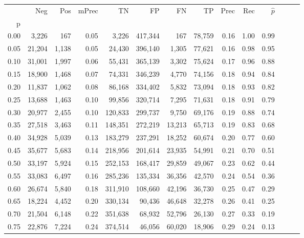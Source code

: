 \begin{tabular}{rrrrrrrrrrrrrr}
\toprule
{} &     Neg &    Pos & mPrec &       TN &       FP &      FN &      TP &  Prec &   Rec & $\hat{p}$ \\
p    &         &        &       &          &          &         &         &       &       &           \\
\midrule
0.00 &   3,226 &    167 &  0.05 &    3,226 &  417,344 &     167 &  78,759 &  0.16 &  1.00 &      0.99 \\
0.05 &  21,204 &  1,138 &  0.05 &   24,430 &  396,140 &   1,305 &  77,621 &  0.16 &  0.98 &      0.95 \\
0.10 &  31,001 &  1,997 &  0.06 &   55,431 &  365,139 &   3,302 &  75,624 &  0.17 &  0.96 &      0.88 \\
0.15 &  18,900 &  1,468 &  0.07 &   74,331 &  346,239 &   4,770 &  74,156 &  0.18 &  0.94 &      0.84 \\
0.20 &  11,837 &  1,062 &  0.08 &   86,168 &  334,402 &   5,832 &  73,094 &  0.18 &  0.93 &      0.82 \\
0.25 &  13,688 &  1,463 &  0.10 &   99,856 &  320,714 &   7,295 &  71,631 &  0.18 &  0.91 &      0.79 \\
0.30 &  20,977 &  2,455 &  0.10 &  120,833 &  299,737 &   9,750 &  69,176 &  0.19 &  0.88 &      0.74 \\
0.35 &  27,518 &  3,463 &  0.11 &  148,351 &  272,219 &  13,213 &  65,713 &  0.19 &  0.83 &      0.68 \\
0.40 &  34,928 &  5,039 &  0.13 &  183,279 &  237,291 &  18,252 &  60,674 &  0.20 &  0.77 &      0.60 \\
0.45 &  35,677 &  5,683 &  0.14 &  218,956 &  201,614 &  23,935 &  54,991 &  0.21 &  0.70 &      0.51 \\
0.50 &  33,197 &  5,924 &  0.15 &  252,153 &  168,417 &  29,859 &  49,067 &  0.23 &  0.62 &      0.44 \\
0.55 &  33,083 &  6,497 &  0.16 &  285,236 &  135,334 &  36,356 &  42,570 &  0.24 &  0.54 &      0.36 \\
0.60 &  26,674 &  5,840 &  0.18 &  311,910 &  108,660 &  42,196 &  36,730 &  0.25 &  0.47 &      0.29 \\
0.65 &  18,224 &  4,452 &  0.20 &  330,134 &   90,436 &  46,648 &  32,278 &  0.26 &  0.41 &      0.25 \\
0.70 &  21,504 &  6,148 &  0.22 &  351,638 &   68,932 &  52,796 &  26,130 &  0.27 &  0.33 &      0.19 \\
0.75 &  22,876 &  7,224 &  0.24 &  374,514 &   46,056 &  60,020 &  18,906 &  0.29 &  0.24 &      0.13 \\

\end{tabular}
